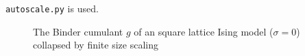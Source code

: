     \texttt{autoscale.py} \cite{autoscale2009} is used.
    \begin{figure}[htbp]
        \centering
        \caption[Examples of determining critical temperature and exponents]
        {
             The Binder cumulant \(g\)
                of an square lattice Ising model (\(\sigma=0\))\\
             collapsed by finite
                size scaling
        }
        \label{fig:gettingCrit}
    \end{figure}\\

